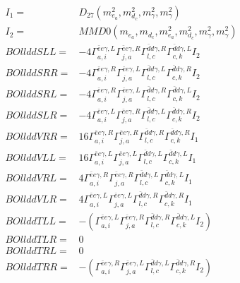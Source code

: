 \documentclass[A4,landscape]{article}
\begin{document}
\begin{align} 
I_1 = & D_{27}(m^2_{e_{{a}}}, m^2_{d_{{c}}}, m^2_{\gamma}, m^2_{\gamma}) \\ 
I_2 = & MMD0(m_{e_{{a}}}, m_{d_{{c}}}, m^2_{e_{{a}}}, m^2_{d_{{c}}}, m^2_{\gamma}, m^2_{\gamma}) \\ 
  BOllddSLL= & -4  \Gamma^{\bar{e}e \gamma ,L}_{a, i} \Gamma^{\bar{e}e \gamma ,R}_{j, a} \Gamma^{\bar{d}d \gamma ,R}_{l, c} \Gamma^{\bar{d}d \gamma ,L}_{c, k} I_2 \\ 
  BOllddSRR= & -4  \Gamma^{\bar{e}e \gamma ,R}_{a, i} \Gamma^{\bar{e}e \gamma ,L}_{j, a} \Gamma^{\bar{d}d \gamma ,L}_{l, c} \Gamma^{\bar{d}d \gamma ,R}_{c, k} I_2 \\ 
  BOllddSRL= & -4  \Gamma^{\bar{e}e \gamma ,R}_{a, i} \Gamma^{\bar{e}e \gamma ,L}_{j, a} \Gamma^{\bar{d}d \gamma ,R}_{l, c} \Gamma^{\bar{d}d \gamma ,L}_{c, k} I_2 \\ 
  BOllddSLR= & -4  \Gamma^{\bar{e}e \gamma ,L}_{a, i} \Gamma^{\bar{e}e \gamma ,R}_{j, a} \Gamma^{\bar{d}d \gamma ,L}_{l, c} \Gamma^{\bar{d}d \gamma ,R}_{c, k} I_2 \\ 
  BOllddVRR= & 16  \Gamma^{\bar{e}e \gamma ,R}_{a, i} \Gamma^{\bar{e}e \gamma ,R}_{j, a} \Gamma^{\bar{d}d \gamma ,R}_{l, c} \Gamma^{\bar{d}d \gamma ,R}_{c, k} I_1 \\ 
  BOllddVLL= & 16  \Gamma^{\bar{e}e \gamma ,L}_{a, i} \Gamma^{\bar{e}e \gamma ,L}_{j, a} \Gamma^{\bar{d}d \gamma ,L}_{l, c} \Gamma^{\bar{d}d \gamma ,L}_{c, k} I_1 \\ 
  BOllddVRL= & 4  \Gamma^{\bar{e}e \gamma ,R}_{a, i} \Gamma^{\bar{e}e \gamma ,R}_{j, a} \Gamma^{\bar{d}d \gamma ,L}_{l, c} \Gamma^{\bar{d}d \gamma ,L}_{c, k} I_1 \\ 
  BOllddVLR= & 4  \Gamma^{\bar{e}e \gamma ,L}_{a, i} \Gamma^{\bar{e}e \gamma ,L}_{j, a} \Gamma^{\bar{d}d \gamma ,R}_{l, c} \Gamma^{\bar{d}d \gamma ,R}_{c, k} I_1 \\ 
  BOllddTLL= & -( \Gamma^{\bar{e}e \gamma ,L}_{a, i} \Gamma^{\bar{e}e \gamma ,R}_{j, a} \Gamma^{\bar{d}d \gamma ,R}_{l, c} \Gamma^{\bar{d}d \gamma ,L}_{c, k} I_2) \\ 
  BOllddTLR= & 0 \\ 
  BOllddTRL= & 0 \\ 
  BOllddTRR= & -( \Gamma^{\bar{e}e \gamma ,R}_{a, i} \Gamma^{\bar{e}e \gamma ,L}_{j, a} \Gamma^{\bar{d}d \gamma ,L}_{l, c} \Gamma^{\bar{d}d \gamma ,R}_{c, k} I_2) \\ 
\end{align} 
\end{document}
